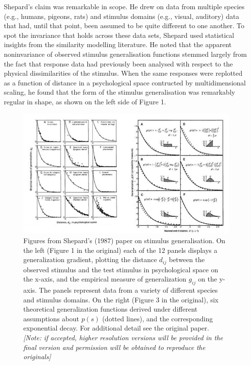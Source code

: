 \documentclass[english,doc]{apa6}
\begin{document}
\noindent
Shepard's claim was remarkable in scope. He drew on data from multiple species (e.g., humans, pigeons, rats) and stimulus domains (e.g., visual, auditory) data that had, until that point, been assumed to be quite different to one another. To spot the invariance that holds across these data sets, Shepard used statistical insights from the similarity modelling literature. He noted that the apparent noninvariance of observed stimulus generalisation functions stemmed largely from the fact that response data had previously been analysed with respect to the physical dissimilarities of the stimulus. When the same responses were replotted as a function of distance in a psychological space contructed by multidimensional scaling, he found that the form of the stimulus generalisation was remarkably regular in shape, as shown on the left side of Figure 1.



\begin{figure}[t]
\includegraphics[width=5.8in]{shepard} \caption{Figures from Shepard's (1987) paper on stimulus generalisation. On the left (Figure 1 in the original) each of the 12 panels displays a generalization gradient, plotting the distance \(d_{ij}\) between the observed stimulus and the test stimulus in psychological space on the x-axis, and the empirical measure of generalization \(g_{ij}\) on the y-axis. The panels represent data from a variety of different species and stimulus domains. On the right (Figure 3 in the original), six theoretical generalization functions derived under different assumptions about \(p(s)\) (dotted lines), and the corresponding exponential decay. For additional detail see the original paper. \emph{{[}Note: if accepted, higher resolution versions will be provided in the final version and permission will be obtained to reproduce the originals{]}}}\label{fig:unnamed-chunk-1}
\end{figure}
\end{document}
